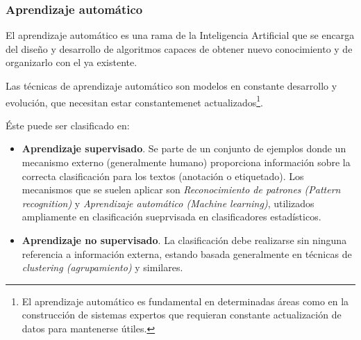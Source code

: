 \documentclass[a4paper, 11pt, titlepage]{article}
\begin{document}
        \subsubsection{Aprendizaje automático}

            El aprendizaje automático es una rama de la Inteligencia Artificial que se encarga 
            del diseño y desarrollo de algoritmos capaces de obtener nuevo conocimiento y de 
            organizarlo con el ya existente.

            Las técnicas de aprendizaje automático son modelos en constante desarrollo y evolución, 
            que necesitan estar constantemenet actualizados\footnote{
                El aprendizaje automático es fundamental en determinadas áreas como en la construcción 
                de sistemas expertos que requieran constante actualización de datos para mantenerse útiles.
            }.

            Éste puede ser clasificado en:

            \begin{itemize}
                \item \textbf{Aprendizaje supervisado}. Se parte de un conjunto de ejemplos 
                donde un mecanismo externo (generalmente humano) proporciona información sobre 
                la correcta clasificación para los textos (anotación o etiquetado). Los mecanismos 
                que se suelen aplicar son \textit{Reconocimiento de patrones (Pattern recognition)}
                y \textit{Aprendizaje automático (Machine learning)}, utilizados ampliamente en 
                clasificación sueprvisada en clasificadores estadísticos.
                \item \textbf{Aprendizaje no supervisado}. La clasificación debe realizarse sin 
                ninguna referencia a información externa, estando basada generalmente en técnicas 
                de \textit{clustering (agrupamiento)} y similares.
            \end{itemize}

            
\end{document}
